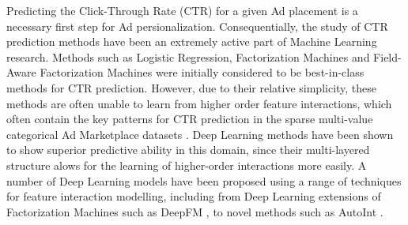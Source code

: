 \documentclass{mldsmsc}
\begin{document}
Predicting the Click-Through Rate (CTR) 
for a given Ad placement is a necessary first step for Ad persionalization. Consequentially, the study of CTR prediction methods have been an extremely active part of 
Machine Learning research. Methods such as Logistic Regression, Factorization Machines \citep{RefWorks:rendle2010factorization} and Field-Aware Factorization 
Machines \citep{RefWorks:juan2016field-aware} were initially considered to be best-in-class methods for CTR prediction. However, due to their relative simplicity, these methods are
often unable to learn from
higher order feature interactions, which often contain the key patterns for CTR prediction in the sparse multi-value categorical Ad Marketplace datasets \citep{RefWorks:zhang2021deep}. Deep Learning methods have been 
shown to show superior predictive ability in this domain, since their multi-layered structure alows for the learning of higher-order interactions
more easily. A number of Deep Learning models have been proposed using a
range of techniques for feature interaction modelling, including from Deep Learning extensions of Factorization Machines
such as DeepFM \citep{RefWorks:guo2017deepfm:}, to novel methods such as AutoInt \citep{RefWorks:song2019autoint}.
\end{document}
